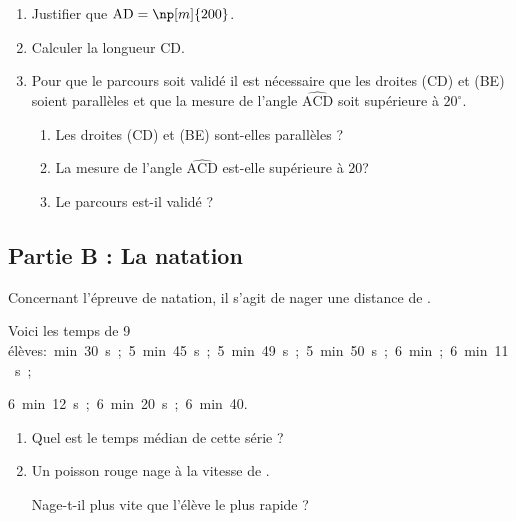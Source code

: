 	\begin{enumerate}
		\item Justifier que $\mathrm{AD} = \np[m]{200}$.
		\item Calculer la longueur CD.
		\item Pour que le parcours soit validé il est nécessaire que les droites (CD) et (BE) soient parallèles et que la mesure de l'angle $\widehat{\mathrm{ACD}}$ soit supérieure à $20^{\circ}$.
		\begin{enumerate}
			\item Les droites (CD) et (BE) sont-elles parallèles ?
			\item La mesure de l'angle $\widehat{\mathrm{ACD}}$ est-elle supérieure à $20$\degres ?
			\item Le parcours est-il validé ?
		\end{enumerate}
	\end{enumerate}

\subsection*{Partie B : La natation}

Concernant l'épreuve de natation, il s'agit de nager une distance de .

Voici les temps de 9 élèves:~min~30~s~;~5~min~45~s~;~5~min~49~s~;~5~min~50~s~;~6~min~;~6~min~11~s~;

6~min~12~s~;~6~min~20~s~;~6~min~40.

\begin{enumerate}[resume*]
\item Quel est le temps médian de cette série ?

\item Un poisson rouge nage à la vitesse de .

Nage-t-il plus vite que l'élève le plus rapide ?
\end{enumerate}

